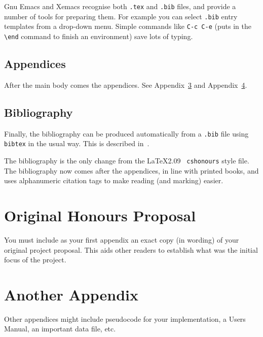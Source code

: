 \documentclass{cshonours}
\begin{document}
Gnu Emacs and Xemacs recognise both {\tt .tex} and {\tt .bib} files,
and provide a number of tools for preparing them. For example you can
select {\tt .bib} entry templates from a drop-down menu. Simple
commands like \verb!C-c C-e! (puts in the \verb!\end! command to
finish an environment) save lots of typing.


\section{Appendices}

After the main body comes the appendices. See Appendix~\ref{appa} and
Appendix~\ref{appb}.

\section{Bibliography}

Finally, the bibliography can be produced automatically from a {\tt .bib} file
using {\tt bibtex} in the usual way. This is described
in~\cite{bible}. 

The bibliography is the only change from the \LaTeX 2.09 {\tt
cshonours} style file. The bibliography now comes after the
appendices, in line with printed books, and uses alphanumeric citation
tags to make reading (and marking) easier.


\appendix

\chapter{Original Honours Proposal}
\label{appa}

You must include as your first appendix an exact copy (in wording) of
your original project proposal. This aids other readers to establish
what was the initial focus of the project.

\chapter{Another Appendix}
\label{appb}

Other appendices might include pseudocode 
for your implementation, a Users Manual, an important data file, etc. 


\end{document}
